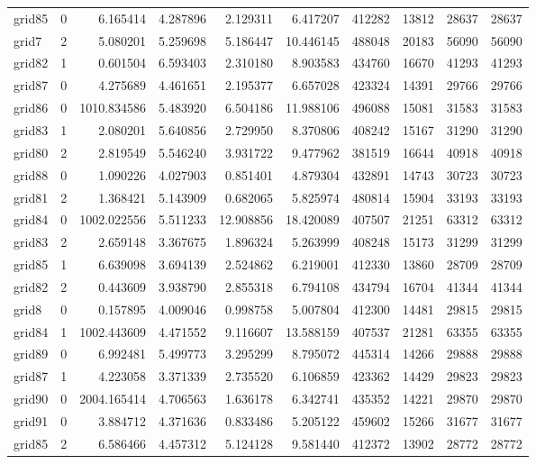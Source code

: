 \begin{longtable}{|l|r|r|r|r|r|r|r|r|r|}
grid85 & 0 & 6.165414 & 4.287896 & 2.129311 & 6.417207 & 412282 & 13812 & 28637 & 28637 \\
grid7 & 2 & 5.080201 & 5.259698 & 5.186447 & 10.446145 & 488048 & 20183 & 56090 & 56090 \\
grid82 & 1 & 0.601504 & 6.593403 & 2.310180 & 8.903583 & 434760 & 16670 & 41293 & 41293 \\
grid87 & 0 & 4.275689 & 4.461651 & 2.195377 & 6.657028 & 423324 & 14391 & 29766 & 29766 \\
grid86 & 0 & 1010.834586 & 5.483920 & 6.504186 & 11.988106 & 496088 & 15081 & 31583 & 31583 \\
grid83 & 1 & 2.080201 & 5.640856 & 2.729950 & 8.370806 & 408242 & 15167 & 31290 & 31290 \\
grid80 & 2 & 2.819549 & 5.546240 & 3.931722 & 9.477962 & 381519 & 16644 & 40918 & 40918 \\
grid88 & 0 & 1.090226 & 4.027903 & 0.851401 & 4.879304 & 432891 & 14743 & 30723 & 30723 \\
grid81 & 2 & 1.368421 & 5.143909 & 0.682065 & 5.825974 & 480814 & 15904 & 33193 & 33193 \\
grid84 & 0 & 1002.022556 & 5.511233 & 12.908856 & 18.420089 & 407507 & 21251 & 63312 & 63312 \\
grid83 & 2 & 2.659148 & 3.367675 & 1.896324 & 5.263999 & 408248 & 15173 & 31299 & 31299 \\
grid85 & 1 & 6.639098 & 3.694139 & 2.524862 & 6.219001 & 412330 & 13860 & 28709 & 28709 \\
grid82 & 2 & 0.443609 & 3.938790 & 2.855318 & 6.794108 & 434794 & 16704 & 41344 & 41344 \\
grid8 & 0 & 0.157895 & 4.009046 & 0.998758 & 5.007804 & 412300 & 14481 & 29815 & 29815 \\
grid84 & 1 & 1002.443609 & 4.471552 & 9.116607 & 13.588159 & 407537 & 21281 & 63355 & 63355 \\
grid89 & 0 & 6.992481 & 5.499773 & 3.295299 & 8.795072 & 445314 & 14266 & 29888 & 29888 \\
grid87 & 1 & 4.223058 & 3.371339 & 2.735520 & 6.106859 & 423362 & 14429 & 29823 & 29823 \\
grid90 & 0 & 2004.165414 & 4.706563 & 1.636178 & 6.342741 & 435352 & 14221 & 29870 & 29870 \\
grid91 & 0 & 3.884712 & 4.371636 & 0.833486 & 5.205122 & 459602 & 15266 & 31677 & 31677 \\
grid85 & 2 & 6.586466 & 4.457312 & 5.124128 & 9.581440 & 412372 & 13902 & 28772 & 28772 \\

\end{longtable}
